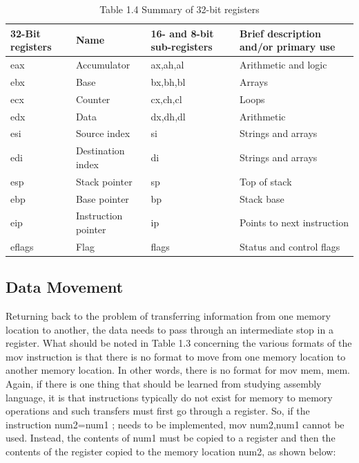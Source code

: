 \documentclass[10pt]{article}
\begin{document}
\begin{table}[h]
\begin{center}
\captionsetup{labelformat=empty}
\caption{Table 1.4 Summary of 32-bit registers}
\begin{tabular}{|l|l|l|l|}
\hline
32-Bit registers & Name & 16- and 8-bit sub-registers & Brief description and/or primary use \\
\hline
eax & Accumulator & ax,ah,al & Arithmetic and logic \\
\hline
ebx & Base & bx,bh,bl & Arrays \\
\hline
ecx & Counter & cx,ch,cl & Loops \\
\hline
edx & Data & dx,dh,dl & Arithmetic \\
\hline
esi & Source index & si & Strings and arrays \\
\hline
edi & Destination index & di & Strings and arrays \\
\hline
esp & Stack pointer & sp & Top of stack \\
\hline
ebp & Base pointer & bp & Stack base \\
\hline
eip & Instruction pointer & ip & Points to next instruction \\
\hline
eflags & Flag & flags & Status and control flags \\
\hline
\end{tabular}
\end{center}
\end{table}

\subsection*{Data Movement}
Returning back to the problem of transferring information from one memory location to another, the data needs to pass through an intermediate stop in a register. What should be noted in Table 1.3 concerning the various formats of the mov instruction is that there is no format to move from one memory location to another memory location. In other words, there is no format for mov mem, mem. Again, if there is one thing that should be learned from studying assembly language, it is that instructions typically do not exist for memory to memory operations and such transfers must first go through a register. So, if the instruction num2=num1 ; needs to be implemented, mov num2,num1 cannot be used. Instead, the contents of num1 must be copied to a register and then the contents of the register copied to the memory location num2, as shown below:
\end{document}
